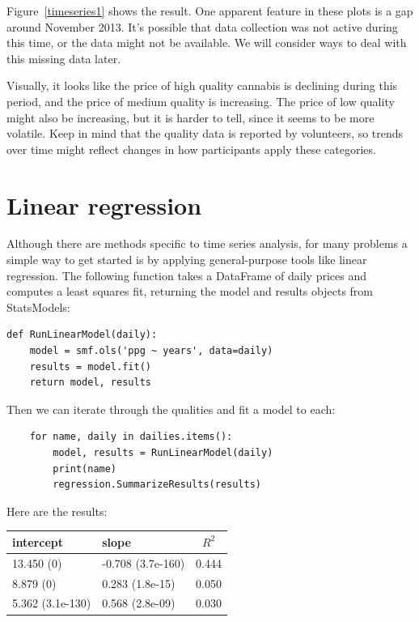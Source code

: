 \documentclass[12pt]{book}
\begin{document}
Figure~\ref{timeseries1} shows the result.  One apparent feature in
these plots is a gap around November 2013.  It's possible that data
collection was not active during this time, or the data might not
be available.  We will consider ways to deal with this missing data
later.

Visually, it looks like the price of high quality cannabis is
declining during this period, and the price of medium quality is
increasing.  The price of low quality might also be increasing, but it
is harder to tell, since it seems to be more volatile.  Keep in mind
that the quality data is reported by volunteers, so trends over time
might reflect changes in how participants apply these categories.


\section{Linear regression}
\label{timeregress}

Although there are methods specific to time series analysis, for many
problems a simple way to get started is by applying general-purpose
tools like linear regression.  The following function takes a
DataFrame of daily prices and computes a least squares fit, returning
the model and results objects from StatsModels:

\begin{verbatim}
def RunLinearModel(daily):
    model = smf.ols('ppg ~ years', data=daily)
    results = model.fit()
    return model, results
\end{verbatim}

Then we can iterate through the qualities and fit a model to
each:

\begin{verbatim}
    for name, daily in dailies.items():
        model, results = RunLinearModel(daily)
        print(name)
        regression.SummarizeResults(results)
\end{verbatim}

Here are the results:

\begin{center}
\begin{tabular}{|l|l|c|} \hline
intercept & slope & $R^2$ \\ \hline
13.450 (0) & -0.708 (3.7e-160) & 0.444 \\
8.879 (0) & 0.283 (1.8e-15) & 0.050 \\
5.362 (3.1e-130) & 0.568 (2.8e-09) & 0.030 \\
\hline
\end{tabular}
\end{center}
\end{document}
